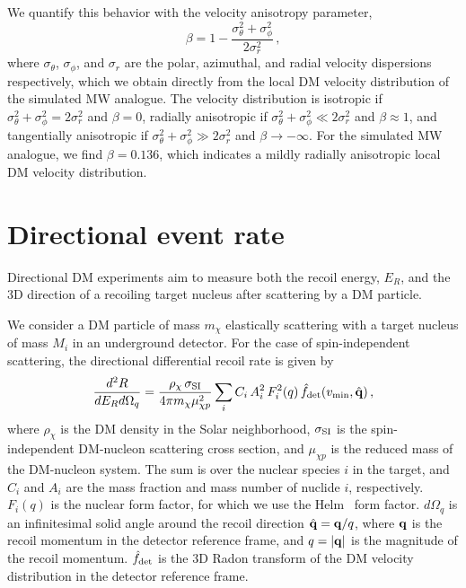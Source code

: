 \documentclass[a4paper,11pt]{article}
\begin{document}
We quantify this behavior with the velocity anisotropy parameter,
\begin{equation}
\beta = 1-\frac{\sigma_\theta^2+\sigma_\phi^2}{2\sigma_r^2}\,,
\end{equation}
where $\sigma_\theta$, $\sigma_\phi$, and $\sigma_r$ are  the polar, azimuthal, and radial velocity dispersions respectively, which we obtain directly from the local DM velocity distribution of the simulated MW analogue. The velocity distribution is isotropic  if $\sigma_\theta^2+\sigma_\phi^2=2\sigma_r^2$ and $\beta =0$, radially anisotropic if $\sigma_\theta^2+\sigma_\phi^2 \ll 2\sigma_r^2$ and $\beta \approx 1$, and tangentially anisotropic if $\sigma_\theta^2+\sigma_\phi^2 \gg 2\sigma_r^2$ and $\beta \to -\infty$. For the simulated MW analogue, we find $\beta=0.136$, which indicates a mildly radially anisotropic local DM velocity distribution.



\section{Directional event rate}
\label{sec:Radon_transform}

Directional DM experiments aim to measure both the recoil energy, $E_R$, and the 3D direction of a recoiling target nucleus after scattering by a DM particle. 

We consider a DM particle of mass $m_\chi$ elastically scattering with a target nucleus of mass $M_i$ in an underground detector. For the case of spin-independent scattering, the directional differential recoil rate is given by~\cite{Gondolo:2002np} 
\begin{equation}
    \frac{d^2 R}{dE_R d\Omega_q} = \frac{\rho_\chi\, \sigma_{\rm SI}}{4\pi m_\chi \mu_{\chi p}^2} \sum_i C_i\, A_i^2\, F^2_i(q)\,  \hat{f}_{\rm{det}}(v_{\rm min},\hat{\bf{q}})\,,
    \label{eq:dir_diff_spec}
\end{equation}
where $\rho_\chi$ is the DM density in the Solar neighborhood, $\sigma_{\rm SI}$ is the spin-independent DM-nucleon scattering cross section, and $\mu_{\chi p}$ is the reduced mass of the DM-nucleon system. The sum is over the nuclear species $i$ in the target, and $C_i$ and $A_i$ are the mass fraction and mass number of nuclide $i$, respectively. $F_i(q)$ is the nuclear form factor, for which we use the Helm~\cite{PhysRev.104.1466} form factor. $d\Omega_q$ is an infinitesimal solid angle around the recoil direction $\hat{\bf q}={\bf q}/q$, where ${\bf q}$ is the recoil momentum in the detector reference frame, and $q=|{\bf q}|$ is the magnitude of the recoil momentum. $\hat{f}_{\rm{det}}$ is the 3D Radon transform of the DM velocity distribution in the detector reference frame.
\end{document}
